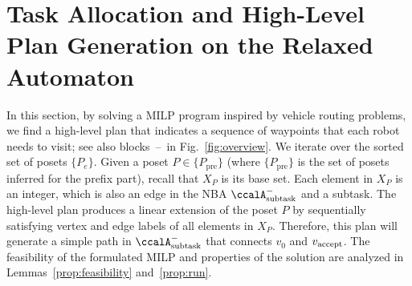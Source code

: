 \documentclass[Afour,sageh,times]{sagej}
\newcommand*\circled[1]{\tikz[baseline=(char.base)]{
            \node[shape=circle,draw,inner sep=1pt] (char) {#1};}}
\newtheorem{exmp}{Example}
\newcommand{\auto}[1]{\ccalA_{\textup{#1}}}
\newcommand{\vertex}[1]{v_{\textup{#1}}}
\newcommand{\node}[1]{V_{n}^{\text{#1}}}
\newenvironment{cexmp}
{\addtocounter{exmp}{-1}\begin{exmp}}
  {\end{exmp}}
\begin{document}
\section{Task Allocation and High-Level Plan Generation  on  the Relaxed Automaton}\label{sec:solution}
In this section,  by solving a MILP program inspired by vehicle routing problems, we find a high-level plan that indicates a sequence of waypoints that each robot needs to visit; see also blocks \circled{3}\,--\,\circled{5} in Fig.~\ref{fig:overview}. We iterate over the sorted set of posets $\{P_e\}$. Given a poset $P\in \{P_\text{pre}\}$ (where $\{P_{\text{pre}}\}$ is the set of posets inferred for the prefix part), recall that $X_{P}$ is its base set. Each element in $X_P$ is an integer, which is also an edge in the NBA $\auto{subtask}^-$ and a subtask.  The high-level plan produces a linear extension of the poset $P$ by sequentially satisfying vertex and edge labels of all elements in $X_P$. Therefore,  this plan will generate a simple path in $\auto{subtask}^-$ that connects $v_0$ and $\vertex{accept}$. The feasibility of the formulated MILP and properties of the solution are analyzed in Lemmas~\ref{prop:feasibility} and~\ref{prop:run}.
\end{document}
